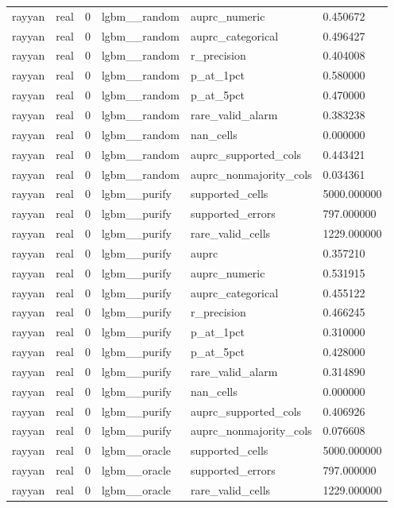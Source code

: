 \begin{tabular}{llllll}
rayyan & real & 0 & lgbm\_\_random & auprc\_numeric & 0.450672 \\
rayyan & real & 0 & lgbm\_\_random & auprc\_categorical & 0.496427 \\
rayyan & real & 0 & lgbm\_\_random & r\_precision & 0.404008 \\
rayyan & real & 0 & lgbm\_\_random & p\_at\_1pct & 0.580000 \\
rayyan & real & 0 & lgbm\_\_random & p\_at\_5pct & 0.470000 \\
rayyan & real & 0 & lgbm\_\_random & rare\_valid\_alarm & 0.383238 \\
rayyan & real & 0 & lgbm\_\_random & nan\_cells & 0.000000 \\
rayyan & real & 0 & lgbm\_\_random & auprc\_supported\_cols & 0.443421 \\
rayyan & real & 0 & lgbm\_\_random & auprc\_nonmajority\_cols & 0.034361 \\
rayyan & real & 0 & lgbm\_\_purify & supported\_cells & 5000.000000 \\
rayyan & real & 0 & lgbm\_\_purify & supported\_errors & 797.000000 \\
rayyan & real & 0 & lgbm\_\_purify & rare\_valid\_cells & 1229.000000 \\
rayyan & real & 0 & lgbm\_\_purify & auprc & 0.357210 \\
rayyan & real & 0 & lgbm\_\_purify & auprc\_numeric & 0.531915 \\
rayyan & real & 0 & lgbm\_\_purify & auprc\_categorical & 0.455122 \\
rayyan & real & 0 & lgbm\_\_purify & r\_precision & 0.466245 \\
rayyan & real & 0 & lgbm\_\_purify & p\_at\_1pct & 0.310000 \\
rayyan & real & 0 & lgbm\_\_purify & p\_at\_5pct & 0.428000 \\
rayyan & real & 0 & lgbm\_\_purify & rare\_valid\_alarm & 0.314890 \\
rayyan & real & 0 & lgbm\_\_purify & nan\_cells & 0.000000 \\
rayyan & real & 0 & lgbm\_\_purify & auprc\_supported\_cols & 0.406926 \\
rayyan & real & 0 & lgbm\_\_purify & auprc\_nonmajority\_cols & 0.076608 \\
rayyan & real & 0 & lgbm\_\_oracle & supported\_cells & 5000.000000 \\
rayyan & real & 0 & lgbm\_\_oracle & supported\_errors & 797.000000 \\
rayyan & real & 0 & lgbm\_\_oracle & rare\_valid\_cells & 1229.000000 \\

\end{tabular}
